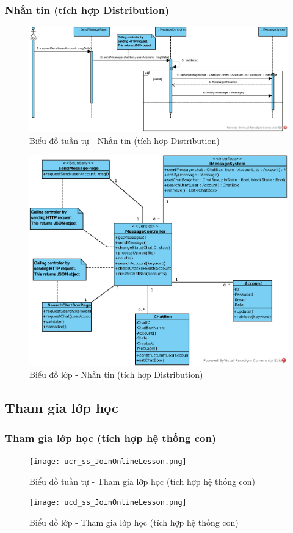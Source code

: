 \documentclass[./../main.tex]{subfiles}
\begin{document}
\subsubsection{Nhắn tin (tích hợp Distribution)}
\begin{figure}[H]
	\centering
	\includegraphics[width=\linewidth]{./images/UseCaseDesignDiagram/ucr_dis_message.eps}
	\caption{Biểu đồ tuần tự - Nhắn tin (tích hợp Distribution)}
\end{figure}
\begin{figure}[H]
	\centering
	\includegraphics[width=\linewidth]{./images/UseCaseDesignDiagram/ucd_dis_message.eps}
	\caption{Biểu đồ lớp - Nhắn tin (tích hợp Distribution)}
\end{figure}

\subsection{Tham gia lớp học}
\subsubsection{Tham gia lớp học (tích hợp hệ thống con)}
\begin{figure}[H]
    \centering
    \texttt{[image: ucr\_ss\_JoinOnlineLesson.png]}
    \caption{Biểu đồ tuần tự - Tham gia lớp học (tích hợp hệ thống con)}
\end{figure}
\begin{figure}[H]
    \centering
    \texttt{[image: ucd\_ss\_JoinOnlineLesson.png]}
    \caption{Biểu đồ lớp - Tham gia lớp học (tích hợp hệ thống con)}
\end{figure}
\end{document}
